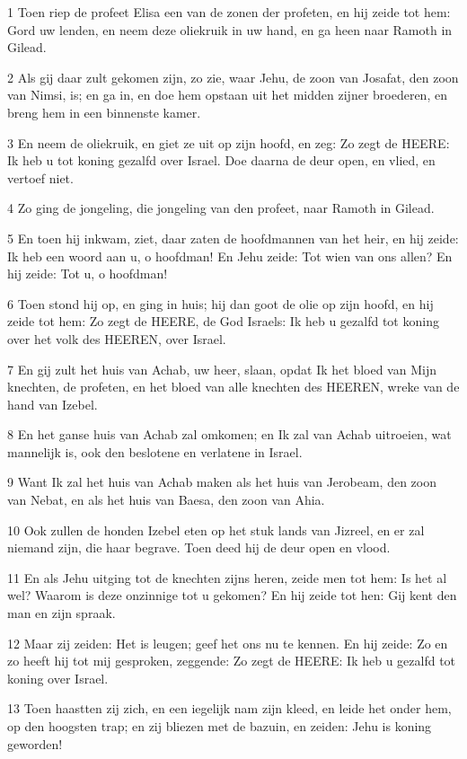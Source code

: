 \par 1 Toen riep de profeet Elisa een van de zonen der profeten, en hij zeide tot hem: Gord uw lenden, en neem deze oliekruik in uw hand, en ga heen naar Ramoth in Gilead.
\par 2 Als gij daar zult gekomen zijn, zo zie, waar Jehu, de zoon van Josafat, den zoon van Nimsi, is; en ga in, en doe hem opstaan uit het midden zijner broederen, en breng hem in een binnenste kamer.
\par 3 En neem de oliekruik, en giet ze uit op zijn hoofd, en zeg: Zo zegt de HEERE: Ik heb u tot koning gezalfd over Israel. Doe daarna de deur open, en vlied, en vertoef niet.
\par 4 Zo ging de jongeling, die jongeling van den profeet, naar Ramoth in Gilead.
\par 5 En toen hij inkwam, ziet, daar zaten de hoofdmannen van het heir, en hij zeide: Ik heb een woord aan u, o hoofdman! En Jehu zeide: Tot wien van ons allen? En hij zeide: Tot u, o hoofdman!
\par 6 Toen stond hij op, en ging in huis; hij dan goot de olie op zijn hoofd, en hij zeide tot hem: Zo zegt de HEERE, de God Israels: Ik heb u gezalfd tot koning over het volk des HEEREN, over Israel.
\par 7 En gij zult het huis van Achab, uw heer, slaan, opdat Ik het bloed van Mijn knechten, de profeten, en het bloed van alle knechten des HEEREN, wreke van de hand van Izebel.
\par 8 En het ganse huis van Achab zal omkomen; en Ik zal van Achab uitroeien, wat mannelijk is, ook den beslotene en verlatene in Israel.
\par 9 Want Ik zal het huis van Achab maken als het huis van Jerobeam, den zoon van Nebat, en als het huis van Baesa, den zoon van Ahia.
\par 10 Ook zullen de honden Izebel eten op het stuk lands van Jizreel, en er zal niemand zijn, die haar begrave. Toen deed hij de deur open en vlood.
\par 11 En als Jehu uitging tot de knechten zijns heren, zeide men tot hem: Is het al wel? Waarom is deze onzinnige tot u gekomen? En hij zeide tot hen: Gij kent den man en zijn spraak.
\par 12 Maar zij zeiden: Het is leugen; geef het ons nu te kennen. En hij zeide: Zo en zo heeft hij tot mij gesproken, zeggende: Zo zegt de HEERE: Ik heb u gezalfd tot koning over Israel.
\par 13 Toen haastten zij zich, en een iegelijk nam zijn kleed, en leide het onder hem, op den hoogsten trap; en zij bliezen met de bazuin, en zeiden: Jehu is koning geworden!
